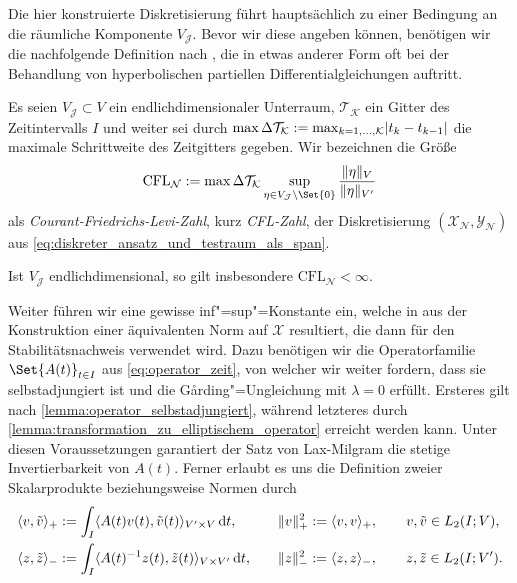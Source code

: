 \documentclass[../main.tex]{subfiles}
\begin{document}
Die hier konstruierte Diskretisierung führt hauptsächlich zu einer Bedingung an die räumliche Komponente $V_{\mathcal J}$.
Bevor wir diese angeben können, benötigen wir die nachfolgende Definition nach \cite[62]{Andreev:2012ep}, die in etwas anderer Form oft bei der Behandlung von hyperbolischen partiellen Differentialgleichungen auftritt.

\begin{Definition}\label{definiton:cfl_zahl}
    Es seien $V_{\mathcal J} \subset V$ ein endlichdimensionaler Unterraum, $\mathcal T_{\mathcal K}$ ein Gitter des Zeitintervalls $I$ und weiter sei durch $\max \Delta \mathcal T_{\mathcal K} := \max_{k = 1, \dots, \mathcal K} \lvert t_{k} - t_{k - 1}\rvert$ die maximale Schrittweite des Zeitgitters gegeben.
    Wir bezeichnen die Größe
    \begin{equation}
        \label{eq:cfl_zahl}
        \mathrm{CFL}_{\mathcal N} := \max \Delta \mathcal T_{\mathcal K} \sup_{\eta \in V_{\mathcal J} \setminus \Set{0} } \frac{\norm{\eta}_{V}}{\norm{\eta}_{V'}}
    \end{equation}
    als \emph{Courant-Friedrichs-Levi-Zahl}, kurz \emph{CFL-Zahl}, der Diskretisierung $(\mathcal X_{\mathcal N}, \mathcal Y_{\mathcal N})$ aus \cref{eq:diskreter_ansatz_und_testraum_als_span}.
\end{Definition}

\begin{Bemerkung}
    Ist $V_{\mathcal J}$ endlichdimensional, so gilt insbesondere $\mathrm{CFL}_{\mathcal N} < \infty$.
\end{Bemerkung}

Weiter führen wir eine gewisse inf"=sup"=Konstante ein, welche in \cite[57]{Andreev:2012ep} aus der Konstruktion einer äquivalenten Norm auf $\mathcal X$ resultiert, die dann für den Stabilitätsnachweis \cite[Theorem 5.2.6]{Andreev:2012ep} verwendet wird.
Dazu benötigen wir die Operatorfamilie $\Set{A(t)}_{t \in I}$ aus \cref{eq:operator_zeit}, von welcher wir weiter fordern, dass sie selbstadjungiert ist und die G\aa{}rding"=Ungleichung mit $\lambda = 0$ erfüllt.
Ersteres gilt nach \cref{lemma:operator_selbstadjungiert}, während letzteres durch \cref{lemma:transformation_zu_elliptischem_operator} erreicht werden kann.
Unter diesen Voraussetzungen garantiert der Satz von Lax-Milgram \cite[Section 6.2.1]{evans2010partial} die stetige Invertierbarkeit von $A(t)$.
Ferner erlaubt es uns die Definition zweier Skalarprodukte beziehungsweise Normen durch
\begin{equation}
    \begin{aligned}
        \langle v,\tilde{v}\rangle_{+} &:= \int_{I} \langle A(t)v(t),\tilde{v}(t)\rangle_{V' \times V} \mathop{}\!\mathrm{d} t,
        \quad&
        \lVert v\rVert^{2}_{+} &:= \langle v,v\rangle_{+},
        \qquad
        v, \tilde{v} \in L_{2}(I; V), \\
        \langle z,\tilde{z}\rangle_{-} &:= \int_{I} \langle A(t)^{-1} z(t),\tilde z(t)\rangle_{V \times V'} \mathop{}\!\mathrm{d} t,
        \quad&
        \lVert z\rVert_{-}^{2} &:= \langle z,z\rangle_{-},
        \qquad z, \tilde z \in L_{2}(I; V').
    \end{aligned}
\end{equation}
\end{document}
